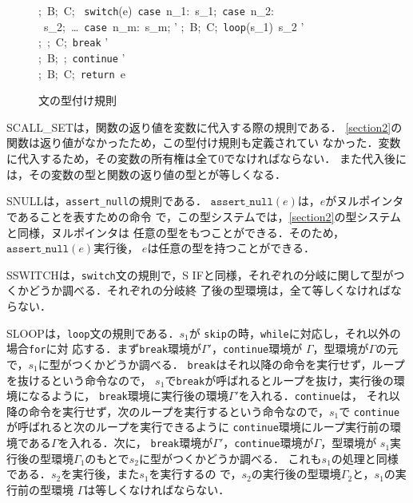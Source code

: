 \begin{figure}[H]
\small
{}
{
\Theta;\ B;\ C;\ \Gamma \vdash
\texttt{switch}(e)\ \texttt{case}\ n_{1}:\ s_1;\ \texttt{case}\ n_{2}:
\ s_2;\ \dots\ \texttt{case}\ n_{m}:\ s_m;
\Rightarrow \Gamma'
}
{
\Theta;\ B;\ C;\ \Gamma \vdash \texttt{loop}(s_1)\ s_2
\Rightarrow \Gamma'
}
~\\[-5pt]
\infrule[Sbreak]{
}
{
\Theta;\ \Gamma;\ C;\ \Gamma \vdash \texttt{break}
\Rightarrow \Gamma'
}
~\\[-5pt]
\infrule[Scontinue]{
}
{
\Theta;\ B;\ \Gamma;\ \Gamma \vdash \texttt{continue}
\Rightarrow \Gamma'
}
~\\[-5pt]
{
\Theta;\ B;\ C;\ \Gamma \vdash \texttt{return}\ e
\Rightarrow \Gamma
}
\caption{文の型付け規則}
\label{typing_stmt}
\end{figure}

S{\footnotesize CALL\_SET}は，関数の返り値を変数に代入する際の規則である．
\ref{section2}の関数は返り値がなかったため，この型付け規則も定義されてい
なかった．変数に代入するため，その変数の所有権は全て$0$でなければならない．
また代入後には，その変数の型と関数の返り値の型とが等しくなる．

S{\footnotesize NULL}は，\texttt{assert\_null}の規則である．
$\texttt{assert\_null}(e)$は，$e$がヌルポインタであることを表すための命令
で，この型システムでは，\ref{section2}の型システムと同様，ヌルポインタは
任意の型をもつことができる．そのため，$\texttt{assert\_null}(e)$実行後，
$e$は任意の型を持つことができる．

S{\footnotesize SWITCH}は，\texttt{switch}文の規則で，S{\footnotesize
IF}と同様，それぞれの分岐に関して型がつくかどうか調べる．それぞれの分岐終
了後の型環境は，全て等しくなければならない．

S{\footnotesize LOOP}は，\texttt{loop}文の規則である．$s_{1}$が
\texttt{skip}の時，\texttt{while}に対応し，それ以外の場合\texttt{for}に対
応する．まず\texttt{break}環境が$\Gamma'$，\texttt{continue}環境が
$\Gamma$，型環境が$\Gamma$の元で，$s_{1}$に型がつくかどうか調べる．
\texttt{break}はそれ以降の命令を実行せず，ループを抜けるという命令なので，
$s_{1}$で\texttt{break}が呼ばれるとループを抜け，実行後の環境になるように，
\texttt{break}環境に実行後の環境$\Gamma'$を入れる．\texttt{continue}は，
それ以降の命令を実行せず，次のループを実行するという命令なので，$s_{1}$で
\texttt{continue}が呼ばれると次のループを実行できるように
\texttt{continue}環境にループ実行前の環境である$\Gamma$を入れる．次に，
\texttt{break}環境が$\Gamma'$，\texttt{continue}環境が$\Gamma$，型環境が
$s_{1}$実行後の型環境$\Gamma_{1}$のもとで$s_{2}$に型がつくかどうか調べる．
これも$s_{1}$の処理と同様である．$s_{2}$を実行後，また$s_{1}$を実行するの
で，$s_{2}$の実行後の型環境$\Gamma_{2}$と，$s_{1}$の実行前の型環境
$\Gamma$は等しくなければならない．

